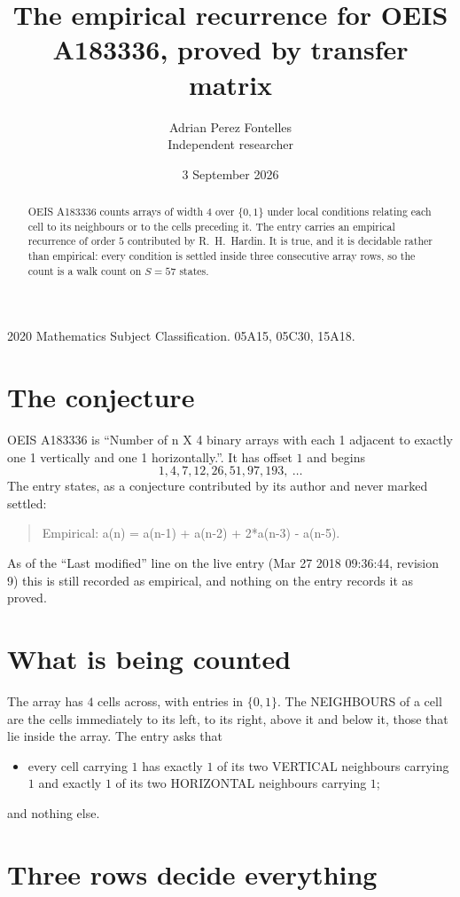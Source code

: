 \documentclass[11pt,a4paper]{article}
\title{The empirical recurrence for OEIS A183336, proved by transfer matrix}
\author{Adrian Perez Fontelles\\ \small Independent researcher}
\date{3 September 2026}
\theoremstyle{plain}
\theoremstyle{definition}
\begin{document}
\maketitle

\begin{abstract}
OEIS A183336 counts arrays of width $4$ over $\{0,1\}$ under local conditions relating each cell
to its neighbours or to the cells preceding it. The entry carries an empirical recurrence of
order $5$ contributed by R.~H.~Hardin. It is true, and it is decidable rather than
empirical: every condition is settled inside three consecutive array rows, so the count is a
walk count on $S=57$ states.
\end{abstract}

\noindent\small 2020 Mathematics Subject Classification. 05A15, 05C30, 15A18.\normalsize

\section{The conjecture}

OEIS A183336 is ``Number of n X 4 binary arrays with each 1 adjacent to exactly one 1 vertically and one 1 horizontally.''. It has offset $1$ and begins
\[
1, 4, 7, 12, 26, 51, 97, 193,\ \dots
\]
The entry states, as a conjecture contributed by its author and never marked settled:
\begin{quote}
Empirical: a(n) = a(n-1) + a(n-2) + 2*a(n-3) - a(n-5).
\end{quote}
As of the ``Last modified'' line on the live entry (Mar 27 2018 09:36:44, revision 9) this is still
recorded as empirical, and nothing on the entry records it as proved.

\section{What is being counted}

The array has $4$ cells across, with entries in $\{0,1\}$. The NEIGHBOURS of a cell are the
cells immediately to its left, to its right, above it and below it, those that lie inside the
array. The entry asks that
\begin{itemize}
\item every cell carrying $1$ has exactly $1$ of its two VERTICAL neighbours carrying $1$ and exactly $1$ of its two HORIZONTAL neighbours carrying $1$;
\end{itemize}
and nothing else.

\section{Three rows decide everything}
\end{document}
